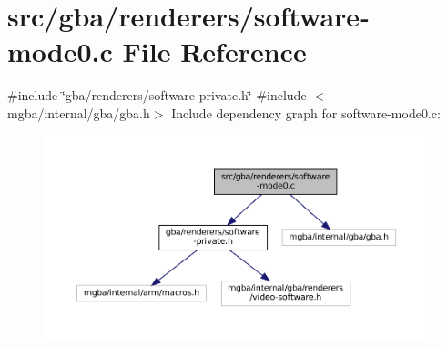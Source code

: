 \hypertarget{software-mode0_8c}{}\section{src/gba/renderers/software-\/mode0.c File Reference}
\label{software-mode0_8c}
{\ttfamily \#include \char`\"{}gba/renderers/software-\/private.\+h\char`\"{}}\newline
{\ttfamily \#include $<$mgba/internal/gba/gba.\+h$>$}\newline
Include dependency graph for software-\/mode0.c\+:
\nopagebreak
\begin{figure}[H]
\begin{center}
\leavevmode
\includegraphics[width=350pt]{software-mode0_8c__incl}
\end{center}
\end{figure}
